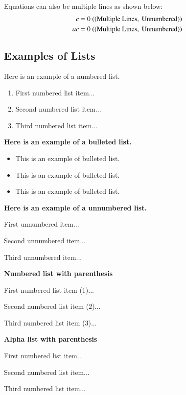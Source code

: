 \documentclass{isabec} %
\begin{document}
Equations can also be multiple lines as shown below:
\begin{eqnarray}
c = 0 \ {\rm ((Multiple\  Lines, \ Unnumbered))}\nonumber\\
ac = 0 \ {\rm ((Multiple \ Lines, \ Unnumbered))}\nonumber
\end{eqnarray}


\subsection{Examples of Lists}
Here is an example of a numbered list.
\begin{enumerate}
      \item First numbered list item...
      \item Second numbered list item...
      \item Third numbered list item...
\end{enumerate}
%
\textbf{Here is an example of a bulleted list.}
\begin{itemize}
  \item This is an example of bulleted list.
  \item This is an example of bulleted list.
  \item This is an example of bulleted list.
\end{itemize}
%
\textbf{Here is an example of a unnumbered list.}
\begin{unnumlist}
  \item First unnumbered item...
  \item Second unnumbered item...
  \item Third unnumbered item...
\end{unnumlist}
%
\textbf{Numbered list with parenthesis}
\begin{arabiclist}%
  \item First numbered list item (1)...
  \item Second numbered list item (2)...
  \item Third numbered list item (3)...
\end{arabiclist}
%
\textbf{Alpha list with parenthesis}
\begin{alphalist}%
  \item First numbered list item...
  \item Second numbered list item...
  \item Third numbered list item...
\end{alphalist}
\end{document}
